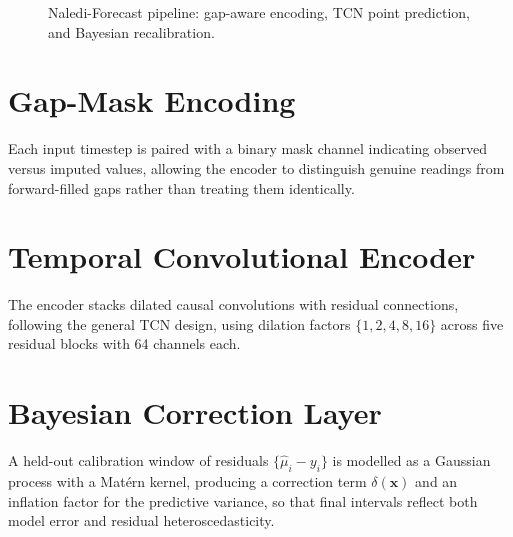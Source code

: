 \documentclass[12pt,a4paper]{report}
\begin{document}
\begin{figure}[htbp]
\centering
{}
\caption{Naledi-Forecast pipeline: gap-aware encoding, TCN point prediction, and Bayesian
recalibration.}
\label{fig:architecture}
\end{figure}

\section{Gap-Mask Encoding}
Each input timestep is paired with a binary mask channel indicating observed versus imputed
values, allowing the encoder to distinguish genuine readings from forward-filled gaps rather
than treating them identically.

\section{Temporal Convolutional Encoder}
The encoder stacks dilated causal convolutions with residual connections, following the
general TCN design, using dilation factors $\{1, 2, 4, 8, 16\}$ across five residual blocks
with 64 channels each.

\section{Bayesian Correction Layer}
A held-out calibration window of residuals $\{\hat{\mu}_i - y_i\}$ is modelled as a
Gaussian process with a Matérn kernel, producing a correction term $\delta(\mathbf{x})$ and
an inflation factor for the predictive variance, so that final intervals reflect both model
error and residual heteroscedasticity.
\end{document}
